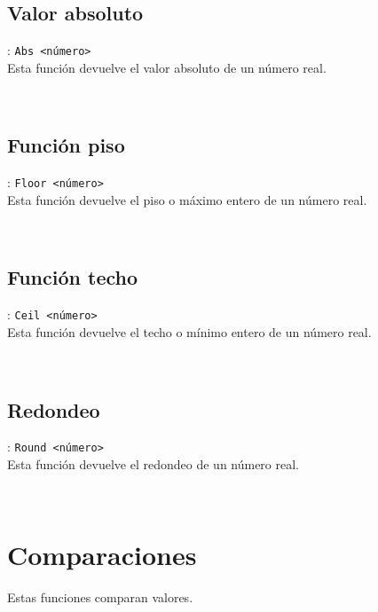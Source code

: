       \subsection*{Valor absoluto}: \texttt{Abs <número>}\\
      Esta función devuelve el valor absoluto de un número real.
      
      \begin{fxcode}
         \\
      \end{fxcode}
      
      \subsection*{Función piso}: \texttt{Floor <número>}\\
      Esta función devuelve el piso o máximo entero de un número real.
      
      \begin{fxcode}
         \\
      \end{fxcode}
      
      \subsection*{Función techo}: \texttt{Ceil <número>}\\
      Esta función devuelve el techo o mínimo entero de un número real.
      
      \begin{fxcode}
         \\
      \end{fxcode}
      
      \subsection*{Redondeo}: \texttt{Round <número>}\\
      Esta función devuelve el redondeo de un número real.
      
      \begin{fxcode}
         \\
      \end{fxcode}
      
   \section{Comparaciones}
      Estas funciones comparan valores.
      
